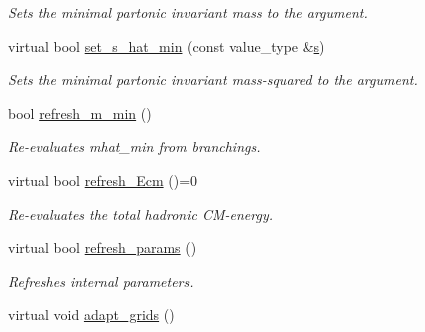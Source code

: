 \begin{DoxyCompactItemize}
\begin{DoxyCompactList}\small\item\em Sets the minimal partonic invariant mass to the argument. \end{DoxyCompactList}\item 
\hypertarget{a00304_a267936bf3ad30578dd484ed9f6330edc}{virtual bool \hyperlink{a00304_a267936bf3ad30578dd484ed9f6330edc}{set\-\_\-s\-\_\-hat\-\_\-min} (const value\-\_\-type \&\hyperlink{a00304_ae2984255cbdaabc293b8168d93c767bf}{s})}\label{a00304_a267936bf3ad30578dd484ed9f6330edc}

\begin{DoxyCompactList}\small\item\em Sets the minimal partonic invariant mass-\/squared to the argument. \end{DoxyCompactList}\item 
\hypertarget{a00304_a2b22b0c269c6f0e27fe6102276de1427}{bool \hyperlink{a00304_a2b22b0c269c6f0e27fe6102276de1427}{refresh\-\_\-m\-\_\-min} ()}\label{a00304_a2b22b0c269c6f0e27fe6102276de1427}

\begin{DoxyCompactList}\small\item\em Re-\/evaluates mhat\-\_\-min from branchings. \end{DoxyCompactList}\item 
\hypertarget{a00304_af24282fe342f982ca26a28d2496cb653}{virtual bool \hyperlink{a00304_af24282fe342f982ca26a28d2496cb653}{refresh\-\_\-\-Ecm} ()=0}\label{a00304_af24282fe342f982ca26a28d2496cb653}

\begin{DoxyCompactList}\small\item\em Re-\/evaluates the total hadronic C\-M-\/energy. \end{DoxyCompactList}\item 
\hypertarget{a00304_af16c0da320b4992d00e63fc4dc0760a2}{virtual bool \hyperlink{a00304_af16c0da320b4992d00e63fc4dc0760a2}{refresh\-\_\-params} ()}\label{a00304_af16c0da320b4992d00e63fc4dc0760a2}

\begin{DoxyCompactList}\small\item\em Refreshes internal parameters. \end{DoxyCompactList}\item 
\hypertarget{a00304_ac172aa22fc7caedb79a7cb377bef3031}{virtual void \hyperlink{a00304_ac172aa22fc7caedb79a7cb377bef3031}{adapt\-\_\-grids} ()}\label{a00304_ac172aa22fc7caedb79a7cb377bef3031}


\end{DoxyCompactItemize}
